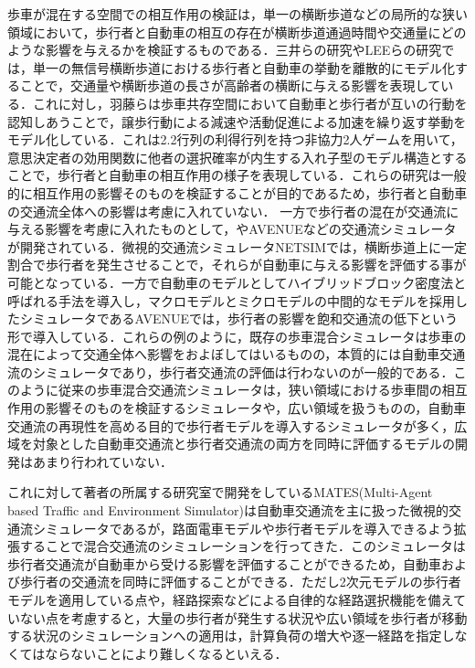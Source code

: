 歩車が混在する空間での相互作用の検証は，単一の横断歩道などの局所的な狭い領域において，歩行者と自動車の相互の存在が横断歩道通過時間や交通量にどのような影響を与えるかを検証するものである．三井らの研究\cite{no_signal}やLEEらの研究\cite{ped_model}では，単一の無信号横断歩道における歩行者と自動車の挙動を離散的にモデル化することで，交通量や横断歩道の長さが高齢者の横断に与える影響を表現している．これに対し，羽藤ら\cite{interaction}は歩車共存空間において自動車と歩行者が互いの行動を認知しあうことで，譲歩行動による減速や活動促進による加速を繰り返す挙動をモデル化している．これは2.2行列の利得行列を持つ非協力2人ゲームを用いて，意思決定者の効用関数に他者の選択確率が内生する入れ子型のモデル構造とすることで，歩行者と自動車の相互作用の様子を表現している．これらの研究は一般的に相互作用の影響そのものを検証することが目的であるため，歩行者と自動車の交通流全体への影響は考慮に入れていない．
一方で歩行者の混在が交通流に与える影響を考慮に入れたものとして，\cite{NETSIM}やAVENUE\cite{AVENUE}などの交通流シミュレータが開発されている．微視的交通流シミュレータNETSIMでは，横断歩道上に一定割合で歩行者を発生させることで，それらが自動車に与える影響を評価する事が可能となっている．一方で自動車のモデルとしてハイブリッドブロック密度法と呼ばれる手法を導入し，マクロモデルとミクロモデルの中間的なモデルを採用したシミュレータであるAVENUEでは，歩行者の影響を飽和交通流の低下という形で導入している．これらの例のように，既存の歩車混合シミュレータは歩車の混在によって交通全体へ影響をおよぼしてはいるものの，本質的には自動車交通流のシミュレータであり，歩行者交通流の評価は行わないのが一般的である．このように従来の歩車混合交通流シミュレータは，狭い領域における歩車間の相互作用の影響そのものを検証するシミュレータや，広い領域を扱うものの，自動車交通流の再現性を高める目的で歩行者モデルを導入するシミュレータが多く，広域を対象とした自動車交通流と歩行者交通流の両方を同時に評価するモデルの開発はあまり行われていない．

これに対して著者の所属する研究室で開発をしているMATES(Multi-Agent based Traffic and Environment Simulator)\cite{mates_1}は自動車交通流を主に扱った微視的交通流シミュレータであるが，路面電車モデルや歩行者モデルを導入できるよう拡張することで混合交通流のシミュレーションを行ってきた\cite{mates_2,mates_3,mates_4}．このシミュレータは歩行者交通流が自動車から受ける影響を評価することができるため，自動車および歩行者の交通流を同時に評価することができる．ただし2次元モデルの歩行者モデルを適用している点や，経路探索などによる自律的な経路選択機能を備えていない点を考慮すると，大量の歩行者が発生する状況や広い領域を歩行者が移動する状況のシミュレーションへの適用は，計算負荷の増大や逐一経路を指定しなくてはならないことにより難しくなるといえる．

